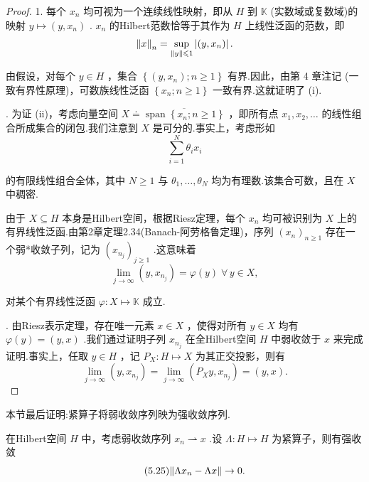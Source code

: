 \begin{proof}
1. 每个 ${x}_{n}$ 均可视为一个连续线性映射，即从 $H$ 到 $\mathbb{K}$ (实数域或复数域)的映射 $y \mapsto  \left( {y,{x}_{n}}\right)$ . ${x}_{n}$ 的Hilbert范数恰等于其作为 $H$ 上线性泛函的范数，即
\[
\norm{x}_{n} = \mathop{\sup }\limits_{{\| y\|  \leqslant  1}}\left| \left( {y,{x}_{n}}\right) \right| .
\]

由假设，对每个 $y \in  H$ ，集合 $\left\{  {\left( {y,{x}_{n}}\right) ;n \geq  1}\right\}$ 有界.因此，由第 4 章注记 (一致有界性原理)，可数族线性泛函 $\left\{  {{x}_{n};n \geq  1}\right\}$ 一致有界.这就证明了 (i).

. 为证 (ii)，考虑向量空间 $X \doteq  \overline{\operatorname{span}\left\{  {{x}_{n};n \geq  1}\right\}  }$ ，即所有点 ${x}_{1},{x}_{2},\ldots$ 的线性组合所成集合的闭包.我们注意到 $X$ 是可分的.事实上，考虑形如
\[
\sum\limits_{{i = 1}}^{N}{\theta }_{i}{x}_{i}
\]

的有限线性组合全体，其中 $N \geq  1$ 与 ${\theta }_{1},\ldots ,{\theta }_{N}$ 均为有理数.该集合可数，且在 $X$ 中稠密.

由于 $X \subseteq  H$ 本身是Hilbert空间，根据Riesz定理，每个 ${x}_{n}$ 均可被识别为 $X$ 上的有界线性泛函.由第2章定理2.34(Banach-阿劳格鲁定理)，序列 ${\left( {x}_{n}\right) }_{n \geq  1}$ 存在一个弱*收敛子列，记为 ${\left( {x}_{{n}_{j}}\right) }_{j \geq  1}$ .这意味着
\[
\mathop{\lim }\limits_{{j \rightarrow  \infty }}\left( {y,{x}_{{n}_{j}}}\right)  = \varphi \left( y\right) \;\forall\,y \in  X,
\]

对某个有界线性泛函 $\varphi: X \mapsto  \mathbb{K}$ 成立.

. 由Riesz表示定理，存在唯一元素 $x \in  X$ ，使得对所有 $y \in  X$ 均有 $\varphi \left( y\right)  = \left( {y,x}\right)$ .我们通过证明子列 ${x}_{{n}_{j}}$ 在全Hilbert空间 $H$ 中弱收敛于 $x$ 来完成证明.事实上，任取 $y \in  H$ ，记 ${P}_{X} : H \mapsto  X$ 为其正交投影，则有
\[
\mathop{\lim }\limits_{{j \rightarrow  \infty }}\left( {y,{x}_{{n}_{j}}}\right)  = \mathop{\lim }\limits_{{j \rightarrow  \infty }}\left( {{P}_{X}y,{x}_{{n}_{j}}}\right)  = \left( {y,x}\right) .
\]
\end{proof}

本节最后证明:紧算子将弱收敛序列映为强收敛序列.

\begin{theorem}\label{thm:compact-weak-to-strong}
在Hilbert空间 $H$ 中，考虑弱收敛序列 ${x}_{n} \rightharpoonup  x$ .设 $\Lambda  : H \mapsto  H$ 为紧算子，则有强收敛
\begin{equation}\tag{5.25}\label{eq:compact-weak-to-strong}
\norm{\Lambda {x}_{n} - {\Lambda x}} \rightarrow  0.
\end{equation}
\end{theorem}

